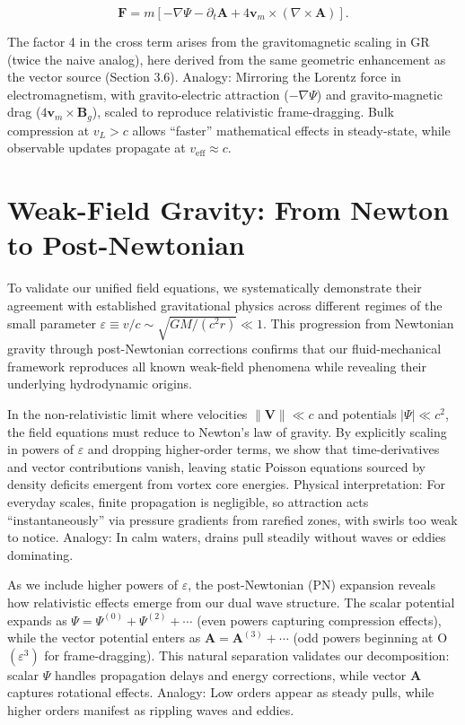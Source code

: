 \documentclass{article}
\begin{document}
\[
\mathbf{F} = m \left[ -\nabla \Psi - \partial_t \mathbf{A} + 4 \mathbf{v}_m \times (\nabla \times \mathbf{A}) \right].
\]

The factor 4 in the cross term arises from the gravitomagnetic scaling in GR (twice the naive analog), here derived from the same geometric enhancement as the vector source (Section 3.6). Analogy: Mirroring the Lorentz force in electromagnetism, with gravito-electric attraction ($-\nabla \Psi$) and gravito-magnetic drag ($4 \mathbf{v}_m \times \mathbf{B}_g$), scaled to reproduce relativistic frame-dragging. Bulk compression at $v_L > c$ allows ``faster'' mathematical effects in steady-state, while observable updates propagate at $v_{\text{eff}} \approx c$.

\section{Weak-Field Gravity: From Newton to Post-Newtonian}

To validate our unified field equations, we systematically demonstrate their agreement with established gravitational physics across different regimes of the small parameter $\varepsilon \equiv v/c \sim \sqrt{GM/(c^2 r)} \ll 1$. This progression from Newtonian gravity through post-Newtonian corrections confirms that our fluid-mechanical framework reproduces all known weak-field phenomena while revealing their underlying hydrodynamic origins.

In the non-relativistic limit where velocities $\|\mathbf{V}\| \ll c$ and potentials $|\Psi| \ll c^2$, the field equations must reduce to Newton's law of gravity. By explicitly scaling in powers of $\varepsilon$ and dropping higher-order terms, we show that time-derivatives and vector contributions vanish, leaving static Poisson equations sourced by density deficits emergent from vortex core energies. Physical interpretation: For everyday scales, finite propagation is negligible, so attraction acts ``instantaneously'' via pressure gradients from rarefied zones, with swirls too weak to notice. Analogy: In calm waters, drains pull steadily without waves or eddies dominating.

As we include higher powers of $\varepsilon$, the post-Newtonian (PN) expansion reveals how relativistic effects emerge from our dual wave structure. The scalar potential expands as $\Psi = \Psi^{(0)} + \Psi^{(2)} + \cdots$ (even powers capturing compression effects), while the vector potential enters as $\mathbf{A} = \mathbf{A}^{(3)} + \cdots$ (odd powers beginning at O$(\varepsilon^3)$ for frame-dragging). This natural separation validates our decomposition: scalar $\Psi$ handles propagation delays and energy corrections, while vector $\mathbf{A}$ captures rotational effects. Analogy: Low orders appear as steady pulls, while higher orders manifest as rippling waves and eddies.
\end{document}
